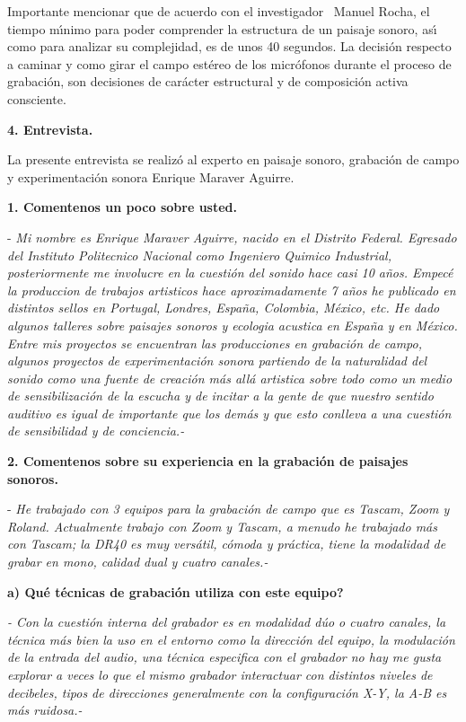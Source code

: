 Importante mencionar que de acuerdo con el investigador \ Manuel Rocha, el
tiempo m\'{\i}nimo para poder comprender la estructura de un paisaje sonoro,
as\'{\i} como para analizar su complejidad, es de unos 40 segundos. La
decisi\'{o}n respecto a caminar y como girar el campo est\'{e}reo de los
micr\'{o}fonos durante el proceso de grabaci\'{o}n, son decisiones de
car\'{a}cter estructural y de composici\'{o}n activa consciente.

\textbf{4. Entrevista.}

La presente entrevista se realiz\'{o} al experto en paisaje sonoro,
grabaci\'{o}n de campo y experimentaci\'{o}n sonora Enrique Maraver Aguirre.

\textbf{1. Comentenos un poco sobre usted. }

- \textit{Mi nombre es Enrique Maraver Aguirre, nacido en el Distrito Federal.
Egresado del Instituto Politecnico Nacional como Ingeniero Quimico Industrial,
posteriormente me involucre en la cuesti\'{o}n del sonido hace casi 10
a\~{n}os. Empec\'{e} la produccion de trabajos artisticos hace aproximadamente
7 a\~{n}os he publicado en distintos sellos en Portugal, Londres, Espa\~{n}a,
Colombia, M\'{e}xico, etc. He dado algunos talleres sobre paisajes sonoros y
ecologia acustica en Espa\~{n}a y en M\'{e}xico. Entre mis proyectos se
encuentran las producciones en grabaci\'{o}n de campo, algunos proyectos de
experimentaci\'{o}n sonora partiendo de la naturalidad del sonido como una
fuente de creaci\'{o}n m\'{a}s all\'{a} artistica sobre todo como un medio de
sensibilizaci\'{o}n de la escucha y de incitar a la gente de que nuestro
sentido auditivo es igual de importante que los dem\'{a}s y que esto conlleva
a una cuesti\'{o}n de sensibilidad y de conciencia.-}

\textbf{2. Comentenos sobre su experiencia en la grabaci\'{o}n de paisajes
sonoros.}

- \textit{He trabajado con 3 equipos para la grabaci\'{o}n de campo que es
Tascam, Zoom y Roland. Actualmente trabajo con Zoom y Tascam, a menudo he
trabajado m\'{a}s con Tascam; la DR40 es muy vers\'{a}til, c\'{o}moda y
pr\'{a}ctica, tiene la modalidad de grabar en mono, calidad dual y cuatro
canales.-}

\textbf{a) \textquestiondown Qu\'{e} t\'{e}cnicas de grabaci\'{o}n utiliza con
este equipo? }

\textit{- Con la cuesti\'{o}n interna del grabador es en modalidad d\'{u}o o
cuatro canales, la t\'{e}cnica m\'{a}s bien la uso en el entorno como la
direcci\'{o}n del equipo, la modulaci\'{o}n de la entrada del audio, una
t\'{e}cnica especifica con el grabador no hay me gusta explorar a veces lo que
el mismo grabador interactuar con distintos niveles de decibeles, tipos de
direcciones generalmente con la configuraci\'{o}n X-Y, la A-B es m\'{a}s
ruidosa.-}

